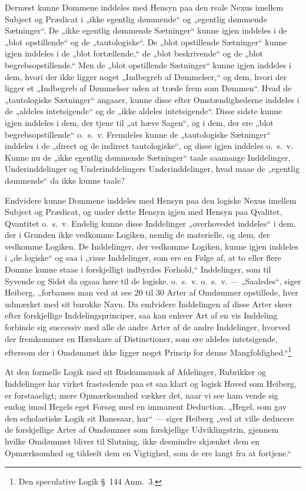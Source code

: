 \documentclass[12pt]{book}
\newcommand{\opage}[1]{\marginnote{\footnotesize\textit{[#1]}}}
\begin{document}
Dernæst kunne Dommene inddeles med Hensyn paa den reale Nexus imellem Subject og Prædicat i „ikke egentlig dømmende“ og „egentlig dømmende Sætninger“. De „ikke egentlig dømmende Sætninger“ kunne igjen inddeles i de „blot opstillende“ og de „tautologiske“. De „blot opstillende Sætninger“ kunne igjen inddeles i de „blot fortællende,“ de „blot beskrivende“ og de „blot begrebsopstillende.“ Men de „blot opstillende Sætninger“ kunne igjen inddeles i dem, hvori der ikke ligger noget „Indbegreb af Dømmelser,“ og dem, hvori der ligger et „Indbegreb af Dømmelser uden at træde frem som Dømmen“. Hvad de „tautologiske Sætninger“ angaaer, kunne disse efter Omstændighederne inddeles i de „aldeles intetsigende“ og de „ikke aldeles intetsigende“. Disse sidste kunne igjen inddeles i dem, der tjene til „at hæve Sagen“, og i dem, der ere „blot begrebsopstillende“ o.~s.~v. Fremdeles kunne de „tautologiske Sætninger“ inddeles i de „direct og de indirect tautologiske“, og disse igjen inddeles o.~s.~v. Kunne nu de „ikke egentlig dømmende Sætninger“ taale saamange Inddelinger, Underinddelinger og Underinddelingers Underinddelinger, hvad maae de „egentlig dømmende“ da ikke kunne taale?

\opage{53}Endvidere kunne Dommene inddeles med Hensyn paa den logiske Nexus imellem Subject og Prædicat, og under dette Hensyn igjen med Hensyn paa Qvalitet, Qvantitet o.~s.~v. Endelig kunne disse Inddelinger „overhovedet inddeles“ i dem, der i Grunden ikke vedkomme Logiken, nemlig de materielle, og dem, der vedkomme Logiken. De Inddelinger, der vedkomme Logiken, kunne igjen inddeles i „de logiske“ og saa i „visse Inddelinger, som ere en Følge af, at to eller flere Domme kunne staae i forskjelligt indbyrdes Forhold,“ Inddelinger, som til Syvende og Sidst da ogsaa høre til de logiske. o.~s.~v. o.~s.~v. --- „Saaledes“, siger Heiberg, „forbauses man ved at see 20 til 30 Arter af Omdømmer opstillede, hver udmærket med sit barokke Navn. Da endvidere Inddelingen af disse Arter skeer efter forskjellige Inddelingsprinciper, saa kan enhver Art af en vis Inddeling forbinde sig successiv med alle de andre Arter af de andre Inddelinger, hvorved der fremkommer en Hærskare af Distinctioner, som ere aldeles intetsigende, eftersom der i Omdømmet ikke ligger noget Princip for denne Mangfoldighed.“\footnote{Den speculative Logik §~144 Anm.~3.}%

At den formelle Logik med sit Ruskumsnusk af Afdelinger, Rubrikker og Inddelinger har virket frastødende paa et saa klart og logisk Hoved som Heiberg, er forstaaeligt; mere Opmærksomhed vækker det, naar vi see ham vende sig endog imod Hegels eget Forsøg med en immanent Deduction. „Hegel, som gav den scholastiske Logik sit Banesaar, har“ --- siger Heiberg „ved at ville deducere de forskjellige Arter af Omdømmer som forskjellige Udviklingstrin, gjennem hvilke Omdømmet bliver til Slutning, ikke desmindre skjænket dem en Opmærksomhed og tildeelt dem en Vigtighed, som de ere langt fra at fortjene.“
\end{document}
